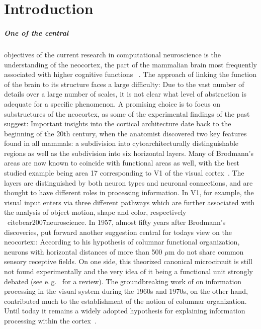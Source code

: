 \chapter{Introduction}
\label{sec:intro}

\paragraph{One of the central} objectives of the current research in computational neuroscience
is the understanding of the neocortex, the part of the mammalian brain 
most frequently associated with higher cognitive functions%
~\cite{bear2007neuroscience}.
The approach of linking the function of the brain to its structure faces a large 
difficulty: Due to the vast number of details over a large number of scales, 
it is not clear what level of abstraction is adequate for a specific phenomenon. 
A promising choice is to focus on substructures of the neocortex, as some of the experimental
findings of the past suggest: 
Important insights into the cortical architecture
date back to the beginning of the 20th century, when 
the anatomist  
discovered two key features found in all mammals:
a subdivision into cytoarchitecturally distinguishable regions 
as well as the subdivision into six horizontal 
layers. Many of Brodmann's areas are now known to coincide with functional areas 
as well, with the best studied example being area 17 corresponding to V1 of the
visual cortex~\cite{bear2007neuroscience}. The layers are 
distinguished by both neuron types and neuronal connections,  
and are thought to have different roles in processing information.
In V1, for example, the visual input enters via three different pathways which 
are further associated with the analysis of object motion, shape and color, respectively%
~cite{bear2007neuroscience}.
In 1957, almost fifty years after Brodmann's discoveries, 
put forward another suggestion central for todays view on the neocortex::
According to his hypothesis of columnar functional organization, neurons with horizontal 
distances of more than 500 $\mu$m do not share common sensory receptive fields.
On one side, this theorized canonical microcircuit is still not found experimentally
and the very idea of it being a functional unit strongly debated (see e.\,g.~%
 for a review). The groundbreaking work of 
on information processing in the visual system during the 1960s and 1970s, on the other hand, 
contributed much to the establishment of the notion of columnar organization. 
Until today it remains a widely adopted hypothesis for explaining information processing 
within the cortex~\cite{defelipe2012neocortical}.   

